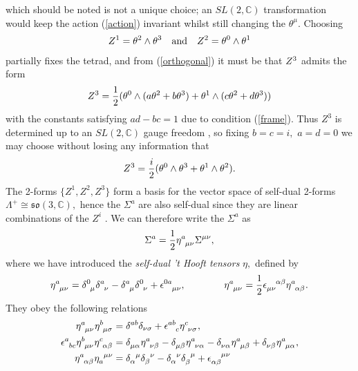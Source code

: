 \documentclass[a4paper,12pt, onecolumn, notitlepage]{article}
\theoremstyle{definition}
\theoremstyle{remark}
\newcommand{\al}{\alpha}
\newcommand{\m}{\mu}
\newcommand{\n}{\nu}
\newcommand{\e}{\epsilon}
\newcommand{\hooft}[3]{\eta\indices{^{#1}_{#2}_{#3}}}
\begin{document}
which should be noted is not a unique choice; an $SL(2,\mathbb{C})$ transformation would keep the action (\ref{action}) invariant whilst still changing the $\theta^{\m}.$ Choosing
\begin{align*}
	Z\indices{^1}=\theta\indices{^2}\wedge\theta\indices{^3}\quad\text{and}\quad
	Z\indices{^2}=\theta\indices{^0}\wedge\theta\indices{^1}
\end{align*}
partially fixes the tetrad, and from (\ref{orthogonal}) it must be that $Z\indices{^3}$ admits the form 
\begin{equation*}
\label{z1z2}
	Z\indices{^3}=\frac{1}{2}(\theta\indices{^0}\wedge(a\theta\indices{^2} + b\theta\indices{^3}) + \theta\indices{^1}\wedge(c\theta{^2} + d\theta\indices{^3}))
\end{equation*}
with the constants satisfying $ad-bc=1$ due to condition (\ref{frame}). Thus $Z^{3}$ is determined up to an $SL(2,\mathbb{C})$ gauge freedom \cite{plebanski_1975}, so fixing $b=c=i,$ $a=d=0$ we may choose without losing any information that
\begin{equation*}
\label{z3}
	Z\indices{^3}=\frac{i}{2}(\theta\indices{^0}\wedge\theta\indices{^3} + \theta\indices{^1}\wedge\theta\indices{^2}).
\end{equation*}
The 2-forms $\{Z^{1},Z^{2}, Z^{3}\}$ form a basis for the vector space of self-dual 2-forms $\Lambda^{+}\cong \mathfrak{so}(3,\mathbb{C}),$ hence the $\Sigma^{a}$ are also self-dual since they are linear combinations of the $Z^{i}$ \cite{cahen_1967}. We can therefore write the $\Sigma^{a}$ as 
\begin{equation}
\Sigma^{a} =  \frac{1}{2}\hooft{a}{\mu}{\n}\Sigma\indices{^\m^\n},
\end{equation}
where we have introduced the \emph{self-dual 't Hooft tensors} $\eta,$ defined by
\begin{equation}
	\label{hooft1}
	\hooft{a}{\m}{\n} =  \delta\indices{^0_\mu}\delta\indices{^a_\nu} - \delta\indices{^a_\mu}\delta\indices{^0_\nu} + \epsilon\indices{^0^a_\mu_\nu},\qquad\qquad\hooft{a}{\m}{\n}=\frac{1}{2}\e\indices{_\m_\n^\al^\beta}\hooft{a}{\al}{\beta}.\\
\end{equation}
They obey the following relations
\begin{subequations}
	\begin{align}
	\label{hooft2}
	\hooft{a}{\m}{\n}\hooft{b}{\m}{\sigma} &= \delta^{ab}\delta_{\nu\sigma} + \epsilon\indices{^a^b_c}\hooft{c}{\nu}{\sigma},\\
	\label{hooft3}
	\e\indices{^a_b_c}\hooft{b}{\m}{\n}\hooft{c}{\al}{\beta}&=\delta\indices{_\m_\al}\hooft{a}{\n}{\beta}-\delta\indices{_\m_\beta}\hooft{a}{\n}{\al}-\delta\indices{_\n_\al}\hooft{a}{\m}{\beta}+\delta\indices{_\n_\beta}\hooft{a}{\m}{\al},\\
	\label{projection}
	\hooft{a}{\al}{\beta}\eta\indices{_{a}^{\mu}^{\nu}} &= \delta\indices{_\al^\mu}\delta\indices{_\beta^\nu} - \delta\indices{_\al^\nu}\delta\indices{_\beta^\mu} + \e\indices{_\al_\beta^\mu^\nu}
	\end{align}
\end{subequations}
\end{document}

